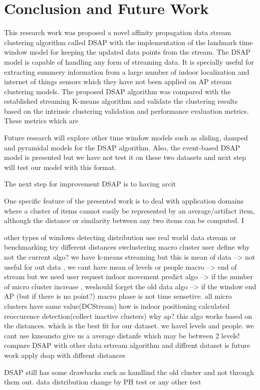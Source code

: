 \documentclass[../UNBThesis2.tex]{subfiles}
\begin{document}
\chapter{Conclusion and Future Work}

This research work was proposed a novel affinity propagation data stream clustering algorithm called DSAP with the implementation of the landmark time window model for keeping the updated data points from the stream. The DSAP model is capable of handling any form of streaming data. It is specially useful for extracting summery information from a large number of indoor localization and internet of things sensors which they have not been applied on AP stream clustering models.
The proposed DSAP algorithm was compared with the established streaming K-means algorithm and validate the clustering results based on the intrinsic clustering validation and performance evaluation metrics. These metrics which are 

Future research will explore other time window models such as sliding, damped and pyramidal models for the DSAP algorithm. Also, the event-based DSAP model is presented but we have not test it on these two datasets and next step will test our model with this format.

The next step for improvement DSAP is to having arcit


One specific feature of the presented work is to deal with application domains where a cluster of items cannot easily be represented by an average/artifact item, although the distance or similarity between any two items can be computed. I

other types of windows
detecting distribution
use real world data stream or benchmarking
try different distances 
swclustering
macro cluster user define
why not the current algo? we have k-means streaming but this is mean of data --> not useful for out data , we cant have mean of levels or people
macro --> end of stream but we need user request
indoor movement predict
algo --> if the number of micro cluster increase , weshould forget the old data
algo --> if the window end AP (but if there is no point?)
macro phase is not time sensetive. all micro clusters have same value(DCStream)
how is indoor positioning calculated
reoccurence detection(collect inactive clusters)
why ap? this algo works based on the distances. which is the best fit for our dataset. we havel levels and people. we cant use kmeansto give us a average distanfe which may be between 2 levels!
compare DSAP with other data srtream algorithm and diffrent dataset is future work
apply dsap with diffrent distances

DSAP still has some drawbacks such as handlind the old cluster and not through them out.
data distribution change by PH test or any other test
\end{document}
